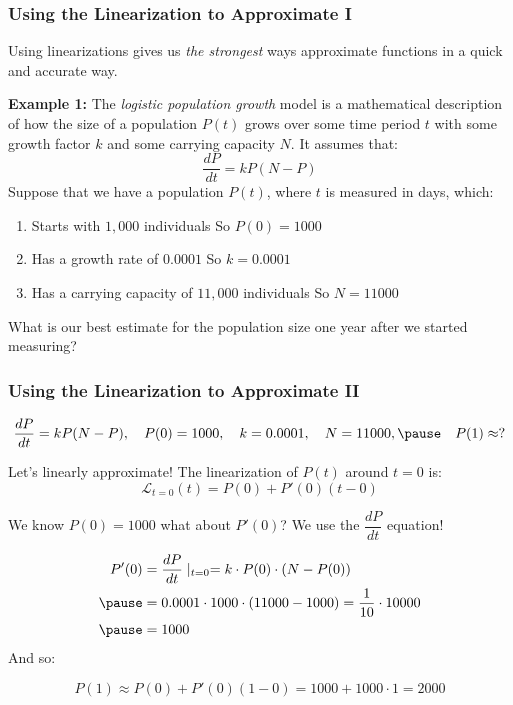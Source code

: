 \documentclass{ltx-talk}
\begin{document}
\begin{frame}
  \frametitle{Using the Linearization to Approximate I}

  Using linearizations gives us \textit{the strongest} ways
  approximate functions in a quick and accurate way. \pause

  \textbf{Example 1:} The \textit{logistic population growth} model
  is a mathematical description of how the size of a population $P(t)$ grows
  over some time period $t$ with some growth factor $k$ and some carrying capacity $N$. It assumes that:
  \begin{equation}
    \dfrac{dP}{dt} = k P(N - P)
  \end{equation}
  Suppose that we have a population $P(t)$, where $t$ is measured in days, which: \pause
  \begin{enumerate}
    \item Starts with $1,000$ individuals \pause So $P(0) = 1000$ \pause
    \item Has a growth rate of $0.0001$ \pause So $k = 0.0001$ \pause
    \item Has a carrying capacity of $11,000$ individuals \pause So $N = 11000$ \pause
  \end{enumerate}

  What is our best estimate for the population size one year after we started measuring?
\end{frame}

\begin{frame}
  \frametitle{Using the Linearization to Approximate II}
  \begin{equation}
    \dfrac{dP}{dt} = kP(N - P), \quad P(0) = 1000, \quad k = 0.0001, \quad N = 11000, \pause \quad P(1) \approx ?
  \end{equation}

  Let's linearly approximate! The linearization of $P(t)$ around $t = 0$ is: \pause
  \begin{equation}
    \mathscr{L}_{t = 0}(t) = P(0) + P'(0)(t - 0)
  \end{equation} \pause

  We know $P(0) = 1000$ \pause what about $P'(0)$? \pause We use the $\dfrac{dP}{dt}$ equation! \pause

  \begin{align}
    P'(0) &= \dfrac{dP}{dt}\mid_{t = 0} = k \cdot P(0) \cdot (N - P(0)) \\ \pause
          &=  0.0001 \cdot 1000 \cdot (11000 - 1000) = \dfrac{1}{10} \cdot 10000 \\ \pause
          &= 1000 
  \end{align} \pause
  And so: \pause

  \begin{equation}
    P(1) \approx P(0) + P'(0)(1 - 0) = 1000 + 1000 \cdot 1 = 2000
  \end{equation}
\end{frame}
\end{document}
